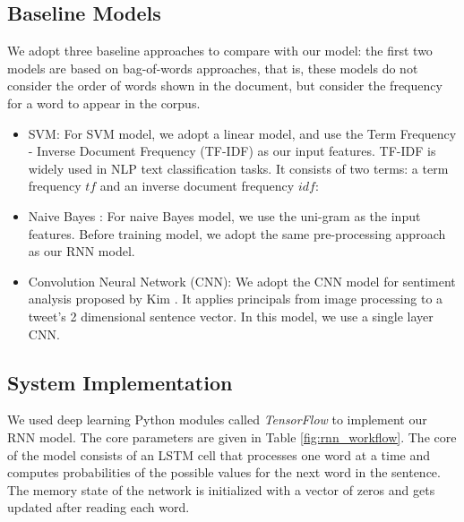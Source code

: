 \subsection{Baseline Models}
We adopt three baseline approaches to compare with our model: the first two models are based on bag-of-words approaches, that is, these models do not consider the order of words shown in the document, but consider the frequency for a word to appear in the corpus.
\begin{itemize}
\item SVM: For SVM model, we adopt a linear model, and use the Term Frequency - Inverse Document Frequency (TF-IDF) as our input features. TF-IDF is widely used in NLP text classification tasks. It consists of two terms: a term frequency \( tf\) and an inverse document frequency \( idf\):
  
\item Naive Bayes : For naive Bayes model, we use the uni-gram as the input features. Before training model, we adopt the same pre-processing approach as our RNN model.
\item Convolution Neural Network (CNN): We adopt the CNN model for sentiment analysis proposed by Kim \etal \cite{kim2014convolutional}. It applies principals from image processing to a tweet's 2 dimensional sentence vector. In this model, we use a single layer CNN.
\end{itemize}
  


\subsection{ System Implementation} 
%
We used deep learning Python modules called \emph{TensorFlow} \cite{tensorflow} to implement our RNN model. The core parameters are given in Table \ref{fig:rnn_workflow}.
%
The core of the model consists of an LSTM cell that processes one word at a time and computes probabilities of the possible values for the next word in the sentence. 
%
The memory state of the network is initialized with a vector of zeros and gets updated after reading each word. 

